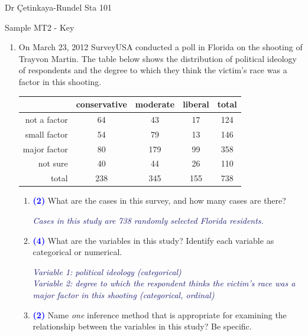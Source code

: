 \documentclass[11pt]{article}
\newcommand{\soln}[1]{\textcolor{MidnightBlue}{\textit{#1}}}	%
\newcommand{\pts}[1]{ \textbf{{\footnotesize \textcolor{blue}{(#1)}}} }	%
\begin{document}
%

Dr \c{C}etinkaya-Rundel \hfill Sta 101 \\

\begin{center}
{\LARGE Sample MT2 - Key}
\end{center}

\begin{enumerate}

\item On March 23, 2012 SurveyUSA conducted a poll in Florida on the shooting of Trayvon Martin. The table below shows the distribution of political ideology of respondents and the degree to which they think the victim's race was a factor in this shooting. \\

\begin{center}
\begin{tabular}{r c c c | c}
  \hline
 			& conservative & moderate	& liberal 	& total \\ 
  \hline
not a factor 	& 64 			&  43 		& 17 		& 124 \\ 
small factor 	& 54			&  79 		& 13 		& 146 \\ 
major factor	& 80 			& 179 		& 99		& 358 \\
not sure		& 40 			& 44 			& 26 		& 110 \\
   \hline
total			& 238		& 345		& 155 	& 738 \\
   \hline
\end{tabular}
\end{center}

\vspace{0.25cm}

\begin{enumerate}

\item \pts{2} What are the cases in this survey, and how many cases are there?

\soln{Cases in this study are 738 randomly selected Florida residents.}

\item \pts{4} What are the variables in this study? Identify each variable as categorical or numerical.

\soln{Variable 1: political ideology (categorical) \\
Variable 2: degree to which the respondent thinks the victim's race was a major factor in this shooting (categorical, ordinal)}

\item \pts{2} Name \emph{one} inference method that is appropriate for examining the relationship between the variables in this study? Be specific.


\end{enumerate}
\end{enumerate}
\end{document}
